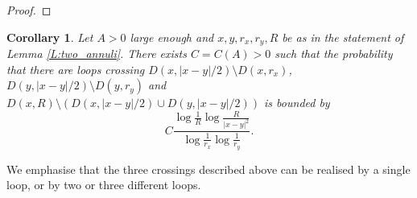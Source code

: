 \documentclass[11pt]{article}
\newtheorem{corollary}[theorem]{Corollary}
\theoremstyle{remark}
\newcommand{\D}{\mathbb{D}}
\newcommand{\PROB}[2]{\mathbb{P}_{#1} \left( #2 \right) }
\numberwithin{equation}{section}
\begin{document}
\begin{proof}

\end{proof}

\begin{corollary}\label{C:3crossings}
Let $A>0$ large enough and $x,y, r_x, r_y, R$ be as in the statement of Lemma \ref{L:two_annuli}.
There exists $C= C(A)>0$ such that
the probability that there are loops crossing $D(x,|x-y|/2) \setminus D(x,r_x)$, $D(y,|x-y|/2) \setminus D(y,r_y)$ and $D(x,R) \setminus (D(x,|x-y|/2) \cup D(y,|x-y|/2))$ is bounded by
\begin{equation}
\label{E:3crossings}
C \frac{\log \frac{1}{R} \log \frac{R}{|x-y|^2}}{\log \frac{1}{r_x} \log \frac{1}{r_y}}.
\end{equation}
\end{corollary}

We emphasise that the three crossings described above can be realised by a single loop, or by two or three different loops.
\end{document}

